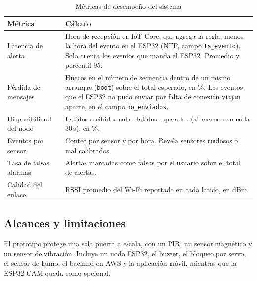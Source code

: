 \documentclass[manuscript,screen,nonacm]{acmart}
\begin{document}
\begin{table}[htbp]
\centering
\caption{Métricas de desempeño del sistema}
\label{tab:metricas}
\footnotesize
\renewcommand{\arraystretch}{1.15}
\begin{tabular}{@{}L{3.2cm}L{9.8cm}@{}}
\toprule
\textbf{Métrica} & \textbf{Cálculo} \\
\midrule
Latencia de alerta & Hora de recepción en IoT Core, que agrega la regla, menos la hora del evento en el ESP32 (NTP, campo \texttt{ts\_evento}). Solo cuenta los eventos que manda el ESP32. Promedio y percentil 95. \\
Pérdida de mensajes & Huecos en el número de secuencia dentro de un mismo arranque (\texttt{boot}) sobre el total esperado, en \%. Los eventos que el ESP32 no pudo enviar por falta de conexión viajan aparte, en el campo \texttt{no\_enviados}. \\
Disponibilidad del nodo & Latidos recibidos sobre latidos esperados (al menos uno cada 30\,s), en \%. \\
Eventos por sensor & Conteo por sensor y por hora. Revela sensores ruidosos o mal calibrados. \\
Tasa de falsas alarmas & Alertas marcadas como falsas por el usuario sobre el total de alertas. \\
Calidad del enlace & RSSI promedio del Wi-Fi reportado en cada latido, en dBm. \\
\bottomrule
\end{tabular}
\end{table}

\subsection{Alcances y limitaciones}
El prototipo protege una sola puerta a escala, con un PIR, un sensor magnético y un sensor de vibración. Incluye un nodo ESP32, el buzzer, el bloqueo por servo, el sensor de humo, el backend en AWS y la aplicación móvil, mientras que la ESP32-CAM queda como opcional.
\end{document}
